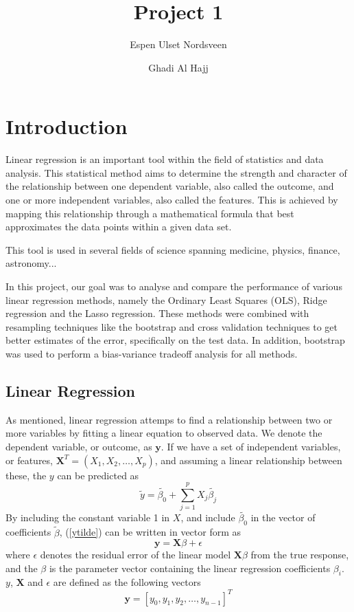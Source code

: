 \documentclass{article}
\title{Project 1}
\author{Espen Ulset Nordsveen
\and Ghadi Al Hajj}
\begin{document}
\maketitle
\section{Introduction}
Linear regression is an important tool within the field of statistics and data analysis. This statistical method aims to determine the strength and character of the relationship between one dependent variable, also called the outcome, and one or more independent variables, also called the features. This is achieved by mapping this relationship through a mathematical formula that best approximates the data points within a given data set.

This tool is used in several fields of science spanning medicine, physics, finance, astronomy...

In this project, our goal was to analyse and compare the performance of various linear regression methods, namely the Ordinary Least Squares (OLS), Ridge regression and the Lasso regression. These methods were combined with resampling techniques like the bootstrap and cross validation techniques to get better estimates of the error, specifically on the test data. In addition, bootstrap was used to perform a bias-variance tradeoff analysis for all methods.

\subsection{Linear Regression}
As mentioned, linear regression attemps to find a relationship between two or more variables by fitting a linear equation to observed data. We denote the dependent variable, or outcome, as $\textbf{y}$. If we have a set of independent variables, or features, $\textbf{X}^{T} = (X_{1}, X_{2}, \dots, X_{p})$, and assuming a linear relationship between these, the $y$ can be predicted as
\begin{equation} \label{ytilde}
\tilde{y} = \tilde{\beta_{0}} + \sum_{j=1}^{p} X_{j} \tilde{\beta_{j}}
\end{equation}
By including the constant variable 1 in $X$, and include $\tilde{\beta_{0}}$ in the vector of coefficients $\tilde{\beta}$,  (\ref{ytilde}) can be written in vector form as
\begin{equation}
\textbf{y} = \textbf{X} \beta + \epsilon
\end{equation}
where $\epsilon$ denotes the residual error of the linear model $\textbf{X}\beta$ from the true response, and the $\beta$ is the parameter vector containing the linear regression coefficients $\beta_{i}$. $y$, $\textbf{X}$ and $\epsilon$ are defined as the following vectors
\begin{equation}
\textbf{y} = [y_{0}, y_{1}, y_{2}, \dots, y_{n-1}]^{T}
\end{equation}
\end{document}
